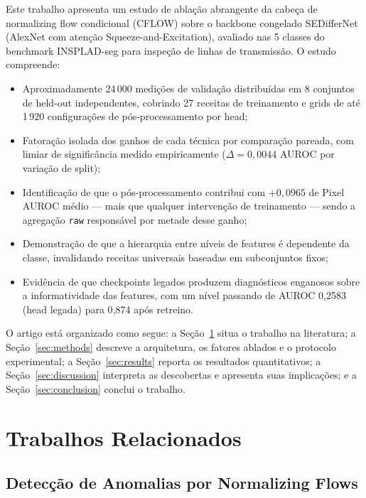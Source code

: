 \documentclass[conference]{IEEEtran}
\begin{document}
Este trabalho apresenta um estudo de ablação abrangente da cabeça de normalizing flow condicional (CFLOW) sobre o backbone congelado SEDifferNet (AlexNet com atenção Squeeze-and-Excitation), avaliado nas 5 classes do benchmark INSPLAD-seg para inspeção de linhas de transmissão. O estudo compreende:

\begin{itemize}
    \item Aproximadamente 24\,000 medições de validação distribuídas em 8 conjuntos de held-out independentes, cobrindo 27 receitas de treinamento e grids de até 1\,920 configurações de pós-processamento por head;
    \item Fatoração isolada dos ganhos de cada técnica por comparação pareada, com limiar de significância medido empiricamente ($\Delta = 0{,}0044$ AUROC por variação de split);
    \item Identificação de que o pós-processamento contribui com $+0{,}0965$ de Pixel AUROC médio --- mais que qualquer intervenção de treinamento --- sendo a agregação \texttt{raw} responsável por metade desse ganho;
    \item Demonstração de que a hierarquia entre níveis de features é dependente da classe, invalidando receitas universais baseadas em subconjuntos fixos;
    \item Evidência de que checkpoints legados produzem diagnósticos enganosos sobre a informatividade das features, com um nível passando de AUROC 0{,}2583 (head legada) para 0{,}874 após retreino.
\end{itemize}

O artigo está organizado como segue: a Seção~\ref{sec:related} situa o trabalho na literatura; a Seção~\ref{sec:methods} descreve a arquitetura, os fatores ablados e o protocolo experimental; a Seção~\ref{sec:results} reporta os resultados quantitativos; a Seção~\ref{sec:discussion} interpreta as descobertas e apresenta suas implicações; e a Seção~\ref{sec:conclusion} conclui o trabalho.


\section{Trabalhos Relacionados}
\label{sec:related}

\subsection{Detecção de Anomalias por Normalizing Flows}
\end{document}

